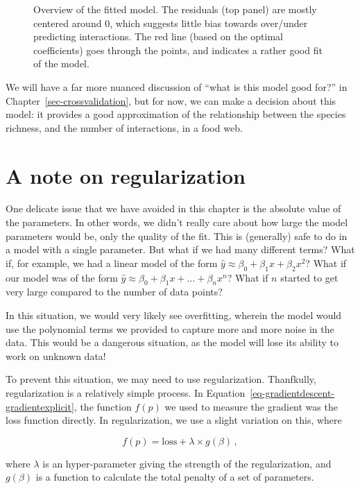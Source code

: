 \documentclass[
  letterpaper,
]{scrbook}
\begin{document}
\begin{figure}[pbt]
{}

\caption{\label{fig-gradient-fitted}Overview of the fitted model. The
residuals (top panel) are mostly centered around 0, which suggests
little bias towards over/under predicting interactions. The red line
(based on the optimal coefficients) goes through the points, and
indicates a rather good fit of the model.}

\end{figure}%

We will have a far more nuanced discussion of ``what is this model good
for?'' in Chapter~\ref{sec-crossvalidation}, but for now, we can make a
decision about this model: it provides a good approximation of the
relationship between the species richness, and the number of
interactions, in a food web.

\section{A note on regularization}\label{a-note-on-regularization}

One delicate issue that we have avoided in this chapter is the absolute
value of the parameters. In other words, we didn't really care about how
large the model parameters would be, only the quality of the fit. This
is (generally) safe to do in a model with a single parameter. But what
if we had many different terms? What if, for example, we had a linear
model of the form \(\hat y \approx \beta_0 + \beta_1 x + \beta_2 x^2\)?
What if our model was of the form
\(\hat y \approx \beta_0 + \beta_1 x + \dots + \beta_n x^n\)? What if
\(n\) started to get very large compared to the number of data points?

In this situation, we would very likely see overfitting, wherein the
model would use the polynomial terms we provided to capture more and
more noise in the data. This would be a dangerous situation, as the
model will lose its ability to work on unknown data!

To prevent this situation, we may need to use regularization.
Thanfkully, regularization is a relatively simple process. In
Equation~\ref{eq-gradientdescent-gradientexplicit}, the function
\(f(p)\) we used to measure the gradient was the loss function directly.
In regularization, we use a slight variation on this, where

\[
f(p) = \text{loss} + \lambda \times g(\beta) \,,
\]

where \(\lambda\) is an hyper-parameter giving the strength of the
regularization, and \(g(\beta)\) is a function to calculate the total
penalty of a set of parameters.
\end{document}
